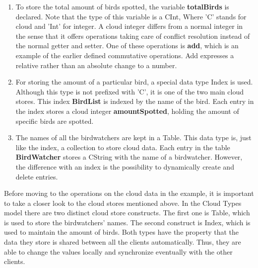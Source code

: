 \documentclass[a4paper,12pt]{report}
\begin{document}
\begin{enumerate}
    \item To store the total amount of birds spotted, the variable \textbf{totalBirds} is declared. Note that the type of this variable is a \textcolor{codedarkblue}{CInt}, Where 'C' stands for cloud and 'Int' for integer. A cloud integer differs from a normal integer in the sense that it offers operations taking care of conflict resolution instead of the normal getter and setter. One of these operations is \textbf{add}, which is an example of the earlier defined commutative operations. Add expresses a relative rather than an absolute change to a number.
    \item For storing the amount of a particular bird, a special data type \textcolor{codeblue}{Index} is used. Although this type is not prefixed with 'C', it is one of the two main cloud stores. This index \textbf{BirdList} is indexed by the name of the bird. Each entry in the index stores a cloud integer \textbf{amountSpotted}, holding the amount of specific birds are spotted. 
    \item The names of all the birdwatchers are kept in a \textcolor{codeblue}{Table}. This data type is, just like the index, a collection to store cloud data. Each entry in the table \textbf{BirdWatcher} stores a \textcolor{codedarkblue}{CString} with the name of a birdwatcher. However, the difference with an index is the possibility to dynamically create and delete entries.
\end{enumerate}

Before moving to the operations on the cloud data in the example, it is important to take a closer look to the cloud stores mentioned above. In the Cloud Types model there are two distinct cloud store constructs. The first one is \textcolor{codedarkblue}{Table}, which is used to store the birdwatchers' names. The second construct is \textcolor{codedarkblue}{Index}, which is used to maintain the amount of birds. Both types have the property that the data they store is shared between all the clients automatically. Thus, they are able to change the values locally and synchronize eventually with the other clients. \\ 
\end{document}
